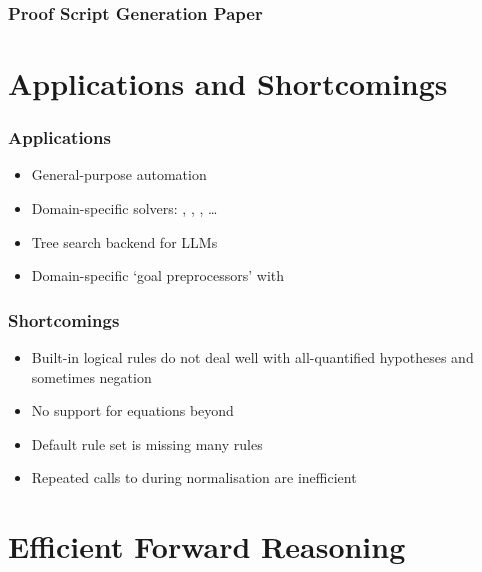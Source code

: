 \documentclass[xetex]{beamer}
\begin{document}
\begin{frame}
  \frametitle{Proof Script Generation Paper}

\end{frame}

\section{Applications and Shortcomings}

\begin{frame}
  \frametitle{Applications}

  \begin{itemize}[<+->]
    \item General-purpose automation
    \item Domain-specific solvers: , , , \dots
    \item Tree search backend for LLMs
    \item Domain-specific \enquote*{goal preprocessors} with 
  \end{itemize}
\end{frame}

\begin{frame}
  \frametitle{Shortcomings}

  \begin{itemize}[<+->]
    \item Built-in logical rules do not deal well with all-quantified hypotheses and sometimes negation
    \item No support for equations beyond 
    \item Default rule set is missing many rules
    \item Repeated calls to  during normalisation are inefficient
  \end{itemize}
\end{frame}

\section{Efficient Forward Reasoning}
\end{document}
